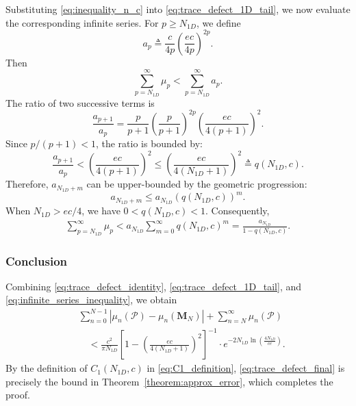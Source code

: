\documentclass[lettersize,journal]{IEEEtran}
\theoremstyle{plain}
\begin{document}
Substituting \eqref{eq:inequality_n_c} into \eqref{eq:trace_defect_1D_tail}, we now evaluate the corresponding infinite series. For $p\geq N_{1D}$, we define
$$
	a_p
	\triangleq
	\frac{c}{4p}
	\left(\frac{ec}{4p}\right)^{2p}.
$$
Then
$$
	\sum_{p=N_{1D}}^{\infty}\mu_p
	<
	\sum_{p=N_{1D}}^{\infty}a_p.
	\label{eq:mu_tail_ap}
$$
The ratio of two successive terms is
$$
	\frac{a_{p+1}}{a_p}
	=
	\frac{p}{p+1}
	\left(\frac{p}{p+1}\right)^{2p}
	\left(
	\frac{ec}{4(p+1)}
	\right)^2.
$$
Since $p/(p+1)<1$, the ratio is bounded by:
$$
	\frac{a_{p+1}}{a_p} <
	\left(
	\frac{ec}{4(p+1)}
	\right)^2 \leq
	\left(
	\frac{ec}{4(N_{1D}+1)}
	\right)^2
	\triangleq
	q(N_{1D},c).
	\label{eq:q_definition}
$$
Therefore, $a_{N_{1D} + m}$ can be upper-bounded by the geometric progression:
$$
	a_{N_{1D} + m}\leq a_{N_{1D}}(q(N_{1D}, c))^m.
$$
When $N_{1D}>ec/4$, we have $0<q(N_{1D},c)<1$.
Consequently,
\begin{align}
	\sum_{p=N_{1D}}^{\infty}\mu_p
	< a_{N_{1D}}\sum_{m=0}^\infty q(N_{1D}, c)^m = 
	\frac{a_{N_{1D}}}
	{1-q(N_{1D},c)}.
	\label{eq:infinite_series_inequality}
\end{align}


\subsubsection{Conclusion}
Combining \eqref{eq:trace_defect_identity},
\eqref{eq:trace_defect_1D_tail}, and
\eqref{eq:infinite_series_inequality}, we obtain
\begin{align}
	&\sum_{n=0}^{N-1}
	\left|
	\mu_n(\mathcal{P})
	-
	\mu_n(\mathbf{M}_N)
	\right|
	+
	\sum_{n=N}^{\infty}\mu_n(\mathcal{P})
	\nonumber\\
	&\quad<
	\frac{c^2}{\pi N_{1D}}
	\left[
	1-
	\left(
	\frac{ec}{4(N_{1D}+1)}
	\right)^2
	\right]^{-1} \cdot e^{-2N_{1D}
		\ln\left(\frac{4N_{1D}}{ce}\right)}.
	\label{eq:trace_defect_final}
\end{align}
By the definition of $C_1(N_{1D},c)$ in
\eqref{eq:C1_definition}, \eqref{eq:trace_defect_final}
is precisely the bound in
Theorem~\ref{theorem:approx_error}, which completes the proof.


\section{}
\label{appendix:channel_representations}
\end{document}
